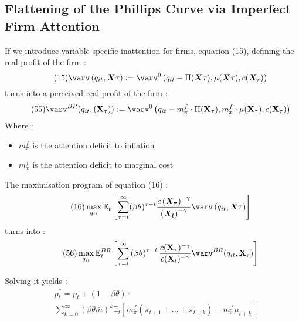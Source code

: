 \documentclass{beamer}
\begin{document}
\subsection{Flattening of the Phillips Curve via Imperfect Firm Attention}
\begin{frame}{\subsecname}
    If we introduce variable specific inattention for firms, equation (15), defining the real profit of the firm : 
    \begin{equation}\tag{15}
        \varv\left(q_{it},\bm{X}{\tau}\right):=\varv^{0}\left(q_{it}-\Pi(\bm{X}{\tau}),\mu(\bm{X}{\tau}),c(\bm{X}_{\tau})\right)
    \end{equation}
    turns into a perceived real profit of the firm :
    \begin{equation}\tag{55}
        \varv^{BR}(q_{it},(\textbf{X}_{\tau})):=\varv^{0}\left(q_{it}-m^{f}_{\pi}\cdot\Pi(\textbf{X}_{\tau}),m^{f}_{x}\cdot\mu(\textbf{X}_{\tau}),c(\textbf{X}_{\tau})\right)
    \end{equation}
    Where : 
    \begin{itemize}
        \item $m^{f}_{\pi}$ is the attention deficit to inflation 
        \item $m^{f}_{x}$ is the attention deficit to marginal cost
    \end{itemize}
\end{frame}

\begin{frame}{\subsecname}
    The maximisation program of equation (16) :
    \begin{equation}\tag{16}
        \max_{q_{it}} \mathbb{E}_{t}\left[\sum_{\tau=t}^{\infty}(\beta\theta)^{\tau-t} \frac{c\left(\bm{X_{\tau}}\right)^{-\gamma}}{\left(\bm{X_{t}}\right)^{-\gamma}} \varv\left(q_{it},\bm{X}{\tau}\right)\right]
    \end{equation}
    turns into :
    \begin{equation}\tag{56}
        \max_{q_{it}}{\mathbb{E}_{t}^{BR}\left[\sum_{\tau=t}^{\infty}\left(\beta\theta\right)^{\tau-t}\frac{c(\textbf{X}_{\tau})^{-\gamma}}{c(\textbf{X}_{t})^{-\gamma}}\varv^{BR}(q_{it},\textbf{X}_{\tau})\right]}
    \end{equation}
\end{frame}

\begin{frame}{\subsecname}
    Solving it yields :
    \begin{equation}\tag{57}
        \begin{split}
            & p^{*}_{t} = p_{t}+(1-\beta\theta) \cdot \\
            & \sum^{\infty}_{k=0} \left(\beta\theta\bar{m}\right)^{k}\mathbb{E}_{t}\left[m^{f}_{\pi}(\pi_{t+1}+...+\pi_{t+k})-m^{f}_{x}\mu_{t+k}\right]
        \end{split}
    \end{equation}
\end{frame}
\end{document}
